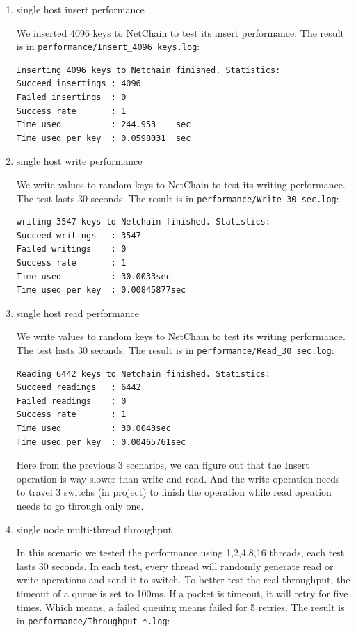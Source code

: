 \documentclass[11pt,oneside,a4paper]{article}
\begin{document}
\begin{enumerate}
    \item single host insert performance
    
    We inserted 4096 keys to NetChain to test its insert performance. The result is in \texttt{performance/Insert\_4096 keys.log}:
    
   \begin{lstlisting}
Inserting 4096 keys to Netchain finished. Statistics:
Succeed insertings : 4096
Failed insertings  : 0
Success rate       : 1
Time used          : 244.953	sec
Time used per key  : 0.0598031	sec
    \end{lstlisting}

\item single host write performance

    We write values to random keys to NetChain to test its writing performance. The test lasts 30 seconds. The result is in \texttt{performance/Write\_30 sec.log}:
    
   \begin{lstlisting}
writing 3547 keys to Netchain finished. Statistics:
Succeed writings   : 3547
Failed writings    : 0
Success rate       : 1
Time used          : 30.0033sec
Time used per key  : 0.00845877sec
    \end{lstlisting}    


\item single host read performance

    We write values to random keys to NetChain to test its writing performance. The test lasts 30 seconds. The result is in \texttt{performance/Read\_30 sec.log}:
    
   \begin{lstlisting}
Reading 6442 keys to Netchain finished. Statistics:
Succeed readings   : 6442
Failed readings    : 0
Success rate       : 1
Time used          : 30.0043sec
Time used per key  : 0.00465761sec
    \end{lstlisting}    


Here from the previous 3 scenarios, we can figure out that the Insert operation is way slower than write and read. And the write operation needs to travel 3 switchs (in project) to finish the operation while read opeation needs to go through only one. 



\item single node multi-thread throughput

    In this scenario we tested the performance using 1,2,4,8,16 threads, each test lasts 30 seconds. In each test, every thread will randomly generate read or write operations and send it to switch. To better test the real throughput, the timeout of a queue is set to 100ms. If a packet is timeout, it will retry for five times. Which means, a failed queuing means failed for 5 retries. The result is in \texttt{performance/Throughput\_*.log}:
    

\end{enumerate}
\end{document}
